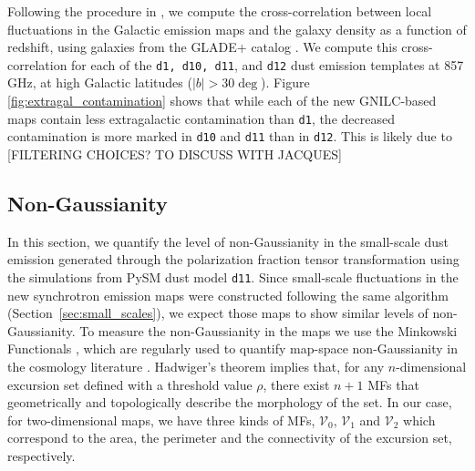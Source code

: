 \documentclass[twocolumn]{aastex631}
\begin{document}
Following the procedure in \citet{Chiang:2019}, we compute the cross-correlation between local fluctuations in the Galactic emission maps and the galaxy density as a function of redshift, using galaxies from the GLADE+ catalog \citep{Dalya:2022}. We compute this cross-correlation for each of the \texttt{d1, d10, d11}, and \texttt{d12} dust emission templates at 857 GHz, at high Galactic latitudes ($\left|b\right| > 30\deg$). Figure \ref{fig:extragal_contamination} shows that while each of the new GNILC-based maps contain less extragalactic contamination than \texttt{d1}, the decreased contamination is more marked in \texttt{d10} and \texttt{d11} than in \texttt{d12}. This is likely due to [FILTERING CHOICES? TO DISCUSS WITH JACQUES]


\subsection{Non-Gaussianity} \label{sec:nongaussianity}

In this section, we quantify the level of non-Gaussianity in the small-scale dust emission generated through the polarization fraction tensor transformation using the simulations from PySM dust model \texttt{d11}. Since small-scale fluctuations in the new synchrotron emission maps were constructed following the same algorithm (Section~\ref{sec:small_scales}), we expect those maps to show similar levels of non-Gaussianity. To measure the non-Gaussianity in the maps we use the Minkowski Functionals \citep[MFs,][]{Minkowski1903}, which are regularly used to quantify map-space non-Gaussianity in the cosmology literature \citep{Martire:2023, Carones:2024}. Hadwiger’s theorem \citep{hadwigerVorlesungenUeberInhalt1957} implies that, for any $n$-dimensional excursion set defined with a threshold value $\rho$, there exist $n+1$ MFs that geometrically and topologically describe the morphology of the set. In our case, for two-dimensional maps, we have three kinds of MFs, $\mathcal{V}_0$, $\mathcal{V}_1$ and $\mathcal{V}_2$ which correspond to the area, the perimeter and the connectivity of the excursion set, respectively.
\end{document}
